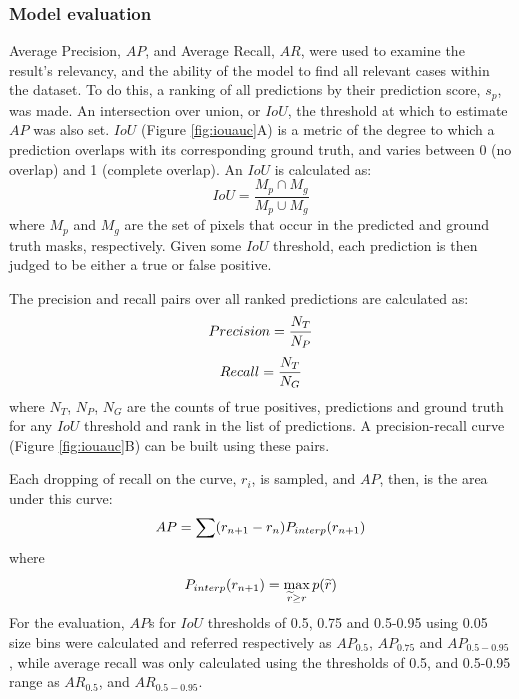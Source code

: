 \documentclass[11pt]{article}
\begin{document}
\subsubsection{Model evaluation}
Average Precision, $AP$, and Average Recall, $AR$, were used to examine the result's relevancy, and the ability of the model to find all relevant cases within the dataset. 
To do this, a ranking of all predictions by their prediction score, $s_{p}$, was made. An intersection over union, or $IoU$, the threshold at which to estimate $AP$ was also set. $IoU$ (Figure \ref{fig:iouauc}A) is a metric of the degree to which a prediction overlaps with its corresponding ground truth, and varies between 0 (no overlap) and 1 (complete overlap). An $IoU$ is calculated as:
\begin{equation}
IoU=\frac{M_p\cap M_g}{M_p\cup M_g}
\end{equation}
where $M_p$ and $M_g$ are the set of pixels that occur in the predicted and ground truth masks, respectively. Given some $IoU$ threshold, each prediction is then judged to be either a true or false positive. \par
The precision and recall pairs over all ranked predictions are calculated as:
\begin{equation}
Precision = \frac{N_{T}}{N_{P}}\\
\end{equation}
\begin{equation}
Recall = \frac{N_{T}}{N_{G}}\\
\end{equation}
where $N_{T}$, $N_{P}$, $N_{G}$ are the counts of true positives, predictions and ground truth for any $IoU$ threshold and rank in the list of predictions. A precision-recall curve (Figure \ref{fig:iouauc}B) can be built using these pairs.\par
Each dropping of recall on the curve, $r_i$, is sampled, and $AP$, then, is the area under this curve:
\begin{equation}
AP = \sum (r_{n+1}-r_n)P_{interp}(r_{n+1})\\
\end{equation}
where
\begin{equation}
P_{interp}(r_{n+1}) = \max_{\widetilde{r}\geq r}p(\widetilde{r})\\
\end{equation}
For the evaluation, $AP$s for $IoU$ thresholds of 0.5, 0.75 and 0.5-0.95 using 0.05 size bins were calculated and referred respectively as $AP_{0.5}$, $AP_{0.75}$ and $AP_{0.5-0.95}$, while average recall was only calculated using the thresholds of 0.5, and 0.5-0.95 range as $AR_{0.5}$, and $AR_{0.5-0.95}$.
\end{document}

